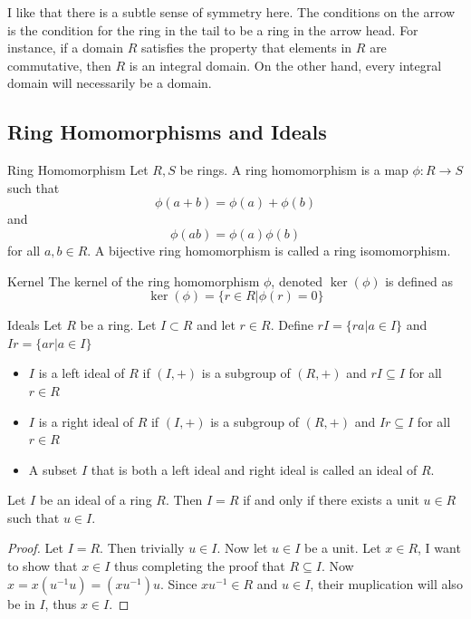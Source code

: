 \documentclass[a4paper]{article}
\begin{document}
I like that there is a subtle sense of symmetry here. The conditions on the arrow is the condition for the ring in the tail to be a ring in the arrow head. For instance, if a domain $R$ satisfies the property that elements in $R$ are commutative, then $R$ is an integral domain. On the other hand, every integral domain will necessarily be a domain. 

\pagebreak
\subsection{Ring Homomorphisms and Ideals}
\begin{defn}{Ring Homomorphism}{} Let $R,S$ be rings. A ring homomorphism is a map $\phi:R\to S$ such that $$\phi(a+b)=\phi(a)+\phi(b)$$ and $$\phi(ab)=\phi(a)\phi(b)$$ for all $a,b\in R$. A bijective ring homomorphism is called a ring isomomorphism. 
\end{defn}

\begin{defn}{Kernel}{} The kernel of the ring homomorphism $\phi$, denoted $\ker(\phi)$ is defined as $$\ker(\phi)=\{r\in R|\phi(r)=0\}$$
\end{defn}

\begin{defn}{Ideals}{} Let $R$ be a ring. Let $I\subset R$ and let $r\in R$. Define $rI=\{ra|a\in I\}$ and $Ir=\{ar|a\in I\}$
\begin{itemize}
\item $I$ is a left ideal of $R$ if $(I,+)$ is a subgroup of $(R,+)$ and $rI\subseteq I$ for all $r\in R$
\item $I$ is a right ideal of $R$ if $(I,+)$ is a subgroup of $(R,+)$ and $Ir\subseteq I$ for all $r\in R$
\item A subset $I$ that is both a left ideal and right ideal is called an ideal of $R$. 
\end{itemize}
\end{defn}

\begin{lmm}{}{} Let $I$ be an ideal of a ring $R$. Then $I=R$ if and only if there exists a unit $u\in R$ such that $u\in I$. \tcbline
\begin{proof}
Let $I=R$. Then trivially $u\in I$. Now let $u\in I$ be a unit. Let $x\in R$, I want to show that $x\in I$ thus completing the proof that $R\subseteq I$. Now $x=x(u^{-1}u)=(xu^{-1})u$. Since $xu^{-1}\in R$ and $u\in I$, their muplication will also be in $I$, thus $x\in I$. 
\end{proof}
\end{lmm}
\end{document}
